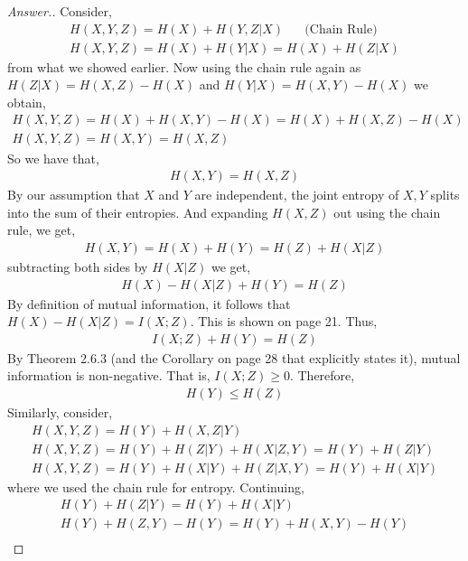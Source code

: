 \documentclass[10pt,twoside]{article}
\begin{document}
\begin{itemize}
\begin{enumerate}
\begin{proof}[Answer.]
    Consider, 
    \begin{gather*}
        H(X,Y,Z) = H(X) + H(Y,Z|X) \hspace{20pt} \text{(Chain Rule)} \\
        H(X,Y,Z) = H(X) + H(Y|X) = H(X) + H(Z|X)
    \end{gather*}
    from what we showed earlier. Now using the chain rule again as $H(Z|X) = H(X,Z) - H(X)$ and $H(Y|X) = H(X,Y) - H(X)$ we obtain,
    \begin{gather*}
        H(X,Y,Z) = H(X) + H(X,Y) - H(X) = H(X) + H(X,Z) - H(X) \\
        H(X,Y,Z) = H(X,Y) = H(X,Z)
    \end{gather*}
    So we have that,
    \begin{gather*}
        H(X,Y) = H(X,Z)
    \end{gather*}
    By our assumption that $X$ and $Y$ are independent, the joint entropy of $X,Y$ splits into the sum of their entropies. And expanding $H(X,Z)$ out using the chain rule, we get, 
    \begin{gather*}
        H(X,Y) = H(X) + H(Y) = H(Z) + H(X|Z)
    \end{gather*}
    subtracting both sides by $H(X|Z)$ we get,
    \begin{gather*}
        H(X) - H(X|Z) + H(Y) = H(Z)
    \end{gather*}
    By definition of mutual information, it follows that $H(X) - H(X|Z) = I(X;Z)$. This is shown on page 21. Thus,
    \begin{gather*}
        I(X;Z) + H(Y) = H(Z)
    \end{gather*}
    By Theorem 2.6.3 (and the Corollary on page 28 that explicitly states it), mutual information is non-negative. That is, $I(X;Z)\geq 0$. Therefore, 
    \begin{gather*}
        H(Y) \leq H(Z)
    \end{gather*}
    Similarly, consider, 
    \begin{gather*}
        H(X,Y,Z) = H(Y) + H(X,Z|Y) \\
        H(X,Y,Z) = H(Y) + H(Z|Y) + H(X|Z,Y) = H(Y) + H(Z|Y) \\
        H(X,Y,Z) = H(Y) + H(X|Y) + H(Z|X,Y) = H(Y) + H(X|Y)
    \end{gather*}
    where we used the chain rule for entropy. Continuing,
    \begin{gather*}
        H(Y) + H(Z|Y) = H(Y) + H(X|Y) \\
        H(Y) + H(Z, Y) - H(Y) = H(Y) + H(X,Y) - H(Y) \\

\end{gather*}
\end{proof}
\end{enumerate}
\end{itemize}
\end{document}
